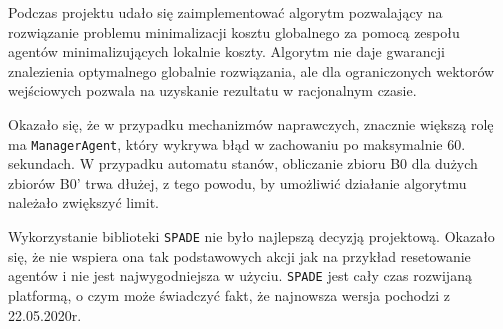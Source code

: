 Podczas projektu udało się zaimplementować algorytm pozwalający na rozwiązanie problemu minimalizacji kosztu globalnego za pomocą zespołu agentów minimalizujących lokalnie koszty. Algorytm nie daje gwarancji znalezienia optymalnego globalnie rozwiązania, ale dla ograniczonych wektorów wejściowych pozwala na uzyskanie rezultatu w racjonalnym czasie.

Okazało się, że w przypadku mechanizmów naprawczych, znacznie większą rolę ma \texttt{ManagerAgent}, który wykrywa błąd w zachowaniu po maksymalnie 60. sekundach. W przypadku automatu stanów, obliczanie zbioru B0 dla dużych zbiorów B0' trwa dłużej, z tego powodu, by umożliwić działanie algorytmu należało zwiększyć limit.


Wykorzystanie biblioteki \texttt{SPADE} nie było najlepszą decyzją projektową. Okazało się, że nie wspiera ona tak podstawowych akcji jak na przykład resetowanie agentów i nie jest najwygodniejsza w użyciu. \texttt{SPADE} jest cały czas rozwijaną platformą, o czym może świadczyć fakt, że najnowsza wersja pochodzi z 22.05.2020r.
